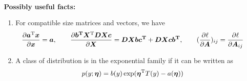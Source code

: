 \documentclass[a4paper,answers,12pt]{exam} %
\begin{document}
\vspace*{\fill}
\hrulefill \\
\vspace{1em}
\textbf{Possibly useful facts:}
\begin{enumerate}

	
	
	\item For compatible size matrices and vectors, we have 
	\begin{align*}
	    \dfrac{\partial \bm{a}^{\mathrm{T}}\bm{x}}{\partial \bm{x}} = \bm{a},\qquad
	   \dfrac{\partial \bm{b^{\mathrm{T}}}\bm{X}^{\mathrm{T}}\bm{D}\bm{X}\bm{c}}{\partial \bm{X}} = \bm{D}\bm{X}\bm{b}\bm{c^{\mathrm{T}}} + \bm{D}\bm{X}\bm{c}\bm{b^{\mathrm{T}}},\qquad
	   (\dfrac{\partial \ell}{\partial \bm{A}})_{ij} = \dfrac{\partial \ell}{\partial \bm{A}_{ij}}
	\end{align*}
	
	\item A class of distribution is in the exponential family if it can be written as
	\begin{equation*}
	    p(y;\bm{\eta}) = b(y)\exp(\bm{\eta}^{\mathrm{T}}T(y)-a(\bm{\eta}))
	\end{equation*}
\end{enumerate}
\newpage
\end{document}
